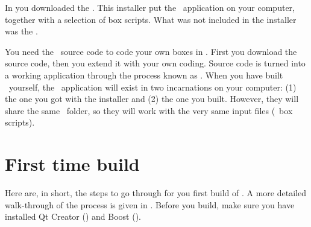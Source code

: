 In  you downloaded the . This installer put the \US\ application on your computer, together with a selection of box scripts. What was not included in the installer was the .

You need the \US\ source code to code your own boxes in \CPP. First you download the source code, then you extend it with your own coding. Source code is turned into a working application through the process known as . When you have built \US\ yourself, the \US\ application will exist in two incarnations on your computer: (1) the one you got with the installer and (2) the one you built. However, they will share the same \ folder, so they will work with the very same input files (\eg\ box scripts).

\section{First time build}
Here are, in short, the steps to go through for you first build of \US. A more detailed walk-through of the process is given in . Before you build, make sure you have installed Qt Creator () and Boost ().

